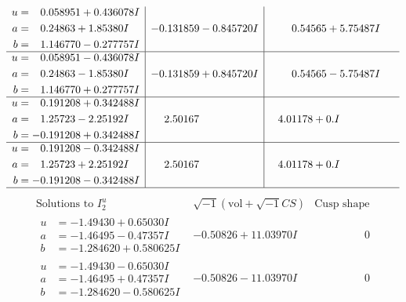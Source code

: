 \documentclass[1p]{elsarticle_modified}
\theoremstyle{definition}
\newcommand{\I}{\sqrt{-1}}
\begin{document}
$$\begin{array}{c|c|c}
\begin{aligned}
u &= \phantom{-}0.058951 + 0.436078 I \\
a &= \phantom{-}0.24863 + 1.85380 I \\
b &= \phantom{-}1.146770 - 0.277757 I\end{aligned}
 & -0.131859 - 0.845720 I & \phantom{-}0.54565 + 5.75487 I \\ \hline\begin{aligned}
u &= \phantom{-}0.058951 - 0.436078 I \\
a &= \phantom{-}0.24863 - 1.85380 I \\
b &= \phantom{-}1.146770 + 0.277757 I\end{aligned}
 & -0.131859 + 0.845720 I & \phantom{-}0.54565 - 5.75487 I \\ \hline\begin{aligned}
u &= \phantom{-}0.191208 + 0.342488 I \\
a &= \phantom{-}1.25723 - 2.25192 I \\
b &= -0.191208 + 0.342488 I\end{aligned}
 & \phantom{-}2.50167\phantom{ +0.000000I} & \phantom{-}4.01178 + 0. I\phantom{ +0.000000I} \\ \hline\begin{aligned}
u &= \phantom{-}0.191208 - 0.342488 I \\
a &= \phantom{-}1.25723 + 2.25192 I \\
b &= -0.191208 - 0.342488 I\end{aligned}
 & \phantom{-}2.50167\phantom{ +0.000000I} & \phantom{-}4.01178 + 0. I\phantom{ +0.000000I}\\
 \hline 
 \end{array}$$\newpage$$\begin{array}{c|c|c}  
\text{Solutions to }I^u_{2}& \I (\text{vol} + \sqrt{-1}CS) & \text{Cusp shape}\\
 \hline 
\begin{aligned}
u &= -1.49430 + 0.65030 I \\
a &= -1.46495 - 0.47357 I \\
b &= -1.284620 + 0.580625 I\end{aligned}
 & -0.50826 + 11.03970 I & \phantom{-0.000000 } 0 \\ \hline\begin{aligned}
u &= -1.49430 - 0.65030 I \\
a &= -1.46495 + 0.47357 I \\
b &= -1.284620 - 0.580625 I\end{aligned}
 & -0.50826 - 11.03970 I & \phantom{-0.000000 } 0 \\ \hline\begin{aligned}

\end{aligned}
\end{array}$$
\end{document}
